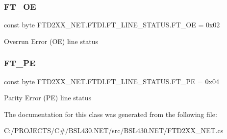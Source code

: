 \subsubsection{\texorpdfstring{FT\_OE}{FT\_OE}}
{\footnotesize\ttfamily const byte F\+T\+D2\+X\+X\+\_\+\+N\+E\+T.\+F\+T\+D\+I.\+F\+T\+\_\+\+L\+I\+N\+E\+\_\+\+S\+T\+A\+T\+U\+S.\+F\+T\+\_\+\+OE = 0x02}



Overrun Error (OE) line status 

\mbox{\label{class_f_t_d2_x_x___n_e_t_1_1_f_t_d_i_1_1_f_t___l_i_n_e___s_t_a_t_u_s_a4457aaf198f118dfe34d0627832a829c}} 
\subsubsection{\texorpdfstring{FT\_PE}{FT\_PE}}
{\footnotesize\ttfamily const byte F\+T\+D2\+X\+X\+\_\+\+N\+E\+T.\+F\+T\+D\+I.\+F\+T\+\_\+\+L\+I\+N\+E\+\_\+\+S\+T\+A\+T\+U\+S.\+F\+T\+\_\+\+PE = 0x04}



Parity Error (PE) line status 



The documentation for this class was generated from the following file\+:\begin{DoxyCompactItemize}
\item 
C\+:/\+P\+R\+O\+J\+E\+C\+T\+S/\+C\#/\+B\+S\+L430.\+N\+E\+T/src/\+B\+S\+L430.\+N\+E\+T/F\+T\+D2\+X\+X\+\_\+\+N\+E\+T.\+cs\end{DoxyCompactItemize}
